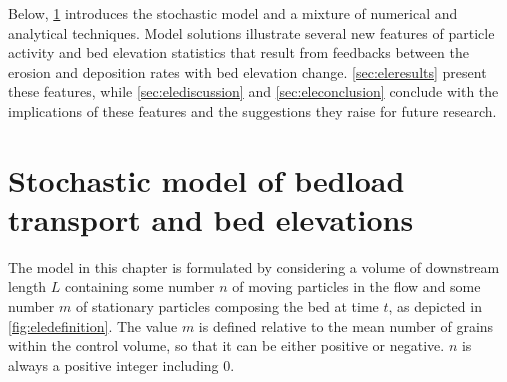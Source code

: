 Below, \DIFdelbegin {}\DIFdelend \DIFaddbegin {}\DIFaddend \ref{sec:elemodel} introduces the stochastic model and \DIFdelbegin {}\DIFdelend \DIFaddbegin {}\DIFaddend a mixture of numerical and analytical techniques. Model solutions illustrate several new features of particle activity and bed elevation statistics that result from feedbacks between the erosion and deposition rates with bed elevation change. \DIFdelbegin {}\DIFdelend \DIFaddbegin {}\DIFaddend \ref{sec:eleresults} present these features, while \DIFdelbegin {}\DIFdelend \DIFaddbegin {}\DIFaddend \ref{sec:elediscussion} and \ref{sec:eleconclusion} conclude with the implications of these features and the suggestions they raise for future research.

\section{Stochastic model of bedload transport and bed elevations}
\label{sec:elemodel}

The model in this chapter is formulated by considering a volume of downstream length $L$ containing some number $n$ of moving particles in the flow and some number $m$ of stationary particles composing the bed at time $t$, as depicted in \DIFdelbegin {}\DIFdelend \DIFaddbegin {}\DIFaddend \ref{fig:eledefinition}. The value $m$ is defined relative to the mean number of grains within the control volume, so that it can be either positive or negative. $n$ is always a positive integer including $0$.

